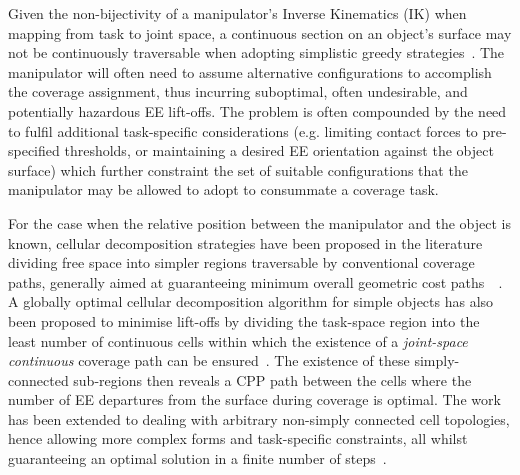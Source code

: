 \documentclass[letterpaper, 10pt, conference]{ieeeconf}
\begin{document}
Given the non-bijectivity of a manipulator's Inverse Kinematics (IK) when mapping from task to joint space, a continuous section on an object's surface may not be continuously traversable when adopting simplistic greedy strategies~\cite{Yang2020Cellular}. The manipulator will often need to assume alternative configurations to accomplish the coverage assignment, thus incurring suboptimal, often undesirable, and potentially hazardous EE lift-offs. The problem is often compounded by the need to fulfil additional task-specific considerations (e.g. limiting contact forces to pre-specified thresholds, or maintaining a desired EE orientation against the object surface) which further constraint the set of suitable configurations that the manipulator may be allowed to adopt to consummate a coverage task. 


For the case when the relative position between the manipulator and the object is known, cellular decomposition strategies have been proposed in the literature dividing free space into simpler regions traversable by conventional coverage paths, generally aimed at guaranteeing minimum overall geometric cost paths~\cite{choset2000exact}~\cite{Acar2002Morse}. 
A globally optimal cellular decomposition algorithm for simple objects has also been proposed to minimise lift-offs by dividing the task-space region into the least number of continuous cells within which the existence of a \textit{joint-space continuous} coverage path can be ensured~\cite{Yang2020Cellular}. The existence of these simply-connected sub-regions then reveals a CPP path between the cells where the number of EE departures from the surface during coverage is optimal. 
The work has been extended to dealing with arbitrary non-simply connected cell topologies, hence allowing more complex forms and task-specific constraints, all whilst guaranteeing an optimal solution in a finite number of steps~\cite{Yang2020Nonrevisiting}.
\end{document}
